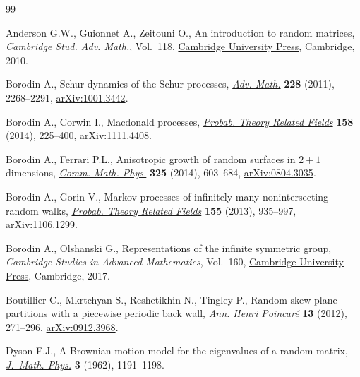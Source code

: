 \documentclass[pdftex]{sigma}
\numberwithin{equation}{section}
\begin{document}
\begin{thebibliography}{99}
\footnotesize\itemsep=0pt

Anderson G.W., Guionnet A., Zeitouni O., An introduction to random matrices,
 \textit{Cambridge Stud. Adv. Math.}, Vol.~118, \href{https://doi.org/10.1017/CBO9780511801334}{Cambridge University Press},
 Cambridge, 2010.

Borodin A., Schur dynamics of the {S}chur processes, \href{https://doi.org/10.1016/j.aim.2011.06.038}{\textit{Adv. Math.}}
 \textbf{228} (2011), 2268--2291, \href{https://arxiv.org/abs/1001.3442}{arXiv:1001.3442}.

Borodin A., Corwin I., Macdonald processes, \href{https://doi.org/10.1007/s00440-013-0482-3}{\textit{Probab. Theory Related
 Fields}} \textbf{158} (2014), 225--400, \href{https://arxiv.org/abs/1111.4408}{arXiv:1111.4408}.

Borodin A., Ferrari P.L., Anisotropic growth of random surfaces in {$2+1$}
 dimensions, \href{https://doi.org/10.1007/s00220-013-1823-x}{\textit{Comm. Math. Phys.}} \textbf{325} (2014), 603--684,
 \href{https://arxiv.org/abs/0804.3035}{arXiv:0804.3035}.

Borodin A., Gorin V., Markov processes of infinitely many nonintersecting
 random walks, \href{https://doi.org/10.1007/s00440-012-0417-4}{\textit{Probab. Theory Related Fields}} \textbf{155} (2013),
 935--997, \href{https://arxiv.org/abs/1106.1299}{arXiv:1106.1299}.

Borodin A., Olshanski G., Representations of the infinite symmetric group,
 \textit{Cambridge Studies in Advanced Mathematics}, Vol.~160, \href{https://doi.org/10.1017/CBO9781316798577}{Cambridge
 University Press}, Cambridge, 2017.

Boutillier C., Mkrtchyan S., Reshetikhin N., Tingley P., Random skew plane
 partitions with a piecewise periodic back wall, \href{https://doi.org/10.1007/s00023-011-0120-5}{\textit{Ann. Henri
 Poincar\'e}} \textbf{13} (2012), 271--296, \href{https://arxiv.org/abs/0912.3968}{arXiv:0912.3968}.

Dyson F.J., A {B}rownian-motion model for the eigenvalues of a random matrix,
 \href{https://doi.org/10.1063/1.1703862}{\textit{J.~Math. Phys.}} \textbf{3} (1962), 1191--1198.


\end{thebibliography}
\end{document}
